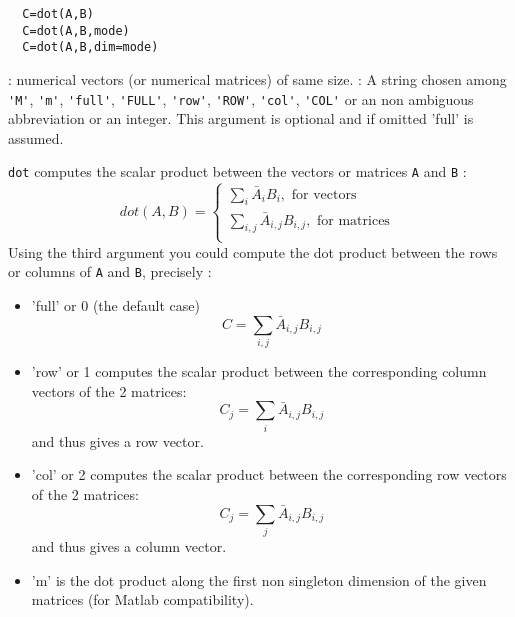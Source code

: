 \begin{mandesc}
\end{mandesc}
\begin{calling_sequence}
\begin{verbatim}
  C=dot(A,B)  
  C=dot(A,B,mode)  
  C=dot(A,B,dim=mode)  
\end{verbatim}
\end{calling_sequence}
\begin{parameters}
  \begin{varlist}
     : numerical vectors (or numerical matrices) of same size.
     : A string chosen among \verb+'M'+, \verb+'m'+, \verb+'full'+, \verb+'FULL'+, \verb+'row'+,
    \verb+'ROW'+, \verb+'col'+, \verb+'COL'+ or an non ambiguous abbreviation or an integer. 
    This argument is optional and if omitted 'full' is assumed.
  \end{varlist}
\end{parameters}
\begin{mandescription}
  \verb+dot+ computes the scalar product between the vectors or matrices \verb+A+ and \verb+B+ :
$$
dot(A,B) = \left\{
\begin{array}{l}
     \sum_{i} \bar{A}_i B_i, \mbox{ for vectors } \\
     \sum_{i,j} \bar{A}_{i,j} B_{i,j}, \mbox{ for matrices } \\
\end{array} \right.
$$ 
 Using the third argument you could compute the dot product between the rows or columns of
 \verb+A+ and \verb+B+, precisely :
  \begin{itemize}
    \item 'full' or 0 (the default case) $$C= \sum_{i,j} \bar{A}_{i,j} B_{i,j}$$
    \item 'row' or 1  computes the scalar product between the corresponding column vectors 
          of the 2 matrices: $$C_j = \sum_{i} \bar{A}_{i,j} B_{i,j}$$ and thus gives a row vector.
    \item 'col' or 2  computes the scalar product between the corresponding row vectors
          of the 2 matrices: $$C_j = \sum_{j} \bar{A}_{i,j} B_{i,j}$$ and thus gives a column vector.
    \item 'm' is the dot product along the first non singleton dimension of the given matrices 
          (for Matlab compatibility). 
  \end{itemize}
\end{mandescription}

